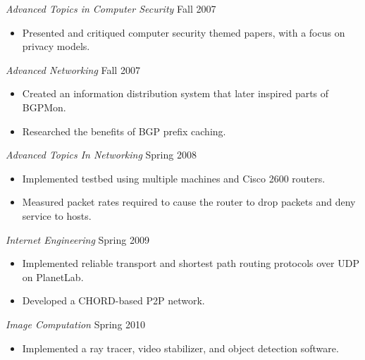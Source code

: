 \documentclass[line,margin]{res}
\begin{document}
\begin{resume}
					{\sl Advanced Topics in Computer Security} \hfill Fall 2007
						\begin{itemize} \itemsep -2pt
						\item Presented and critiqued computer security themed papers, with a focus on privacy models.
						\end{itemize}


					{\sl Advanced Networking} \hfill Fall 2007
			 		\begin{itemize} \itemsep -2pt
                        \item Created an information distribution system that later inspired parts of BGPMon.
                        \item Researched the benefits of BGP prefix caching.
                    \end{itemize}

					{\sl Advanced Topics In Networking} \hfill Spring 2008
					\begin{itemize} \itemsep -2pt
						\item Implemented testbed using multiple machines and Cisco 2600 routers.
						\item Measured packet rates required to cause the router to drop packets and deny service to hosts.
					\end{itemize}


					{\sl Internet Engineering} \hfill Spring 2009
                    \begin{itemize}
                        \item Implemented reliable transport and shortest path routing protocols over UDP on PlanetLab.
                        \item Developed a CHORD-based P2P network.
                    \end{itemize}

					{\sl Image Computation} \hfill Spring 2010
                    \begin{itemize} \itemsep -2pt
                        \item Implemented a ray tracer, video stabilizer, and object detection software.
                    \end{itemize}




\end{resume}
\end{document}

